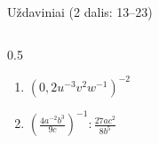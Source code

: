 \documentclass[aspectratio=169,10pt]{beamer}
\begin{document}
\begin{frame}{Uždaviniai (2 dalis: 13--23)}
\begin{columns}[T]
\begin{column}{0.5\textwidth}
\begin{enumerate}
                \item
                $\left(
                0{,}2u^{-3}v^2w^{-1}
                \right)^{-2}$

                \item
                $\left(
                \frac{4a^{-2}b^3}{9c}
                \right)^{-1}
                :
                \frac{27ac^2}{8b^5}$

            \end{enumerate}

        \end{column}

    \end{columns}

\end{frame}

\end{document}
